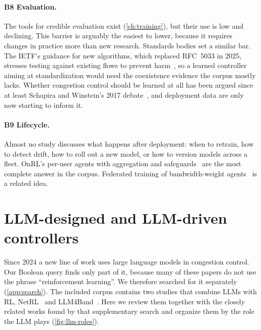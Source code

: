 \paragraph{B8 Evaluation.} The tools for credible evaluation exist (\cref{ch:training}), but their use is low and declining. This barrier is arguably the easiest to lower, because it requires changes in practice more than new research. Standards bodies set a similar bar. The IETF's guidance for new algorithms, which replaced RFC~5033 in 2025, stresses testing against existing flows to prevent harm~\cite{rfc9743}, so a learned controller aiming at standardization would need the coexistence evidence the corpus mostly lacks. Whether congestion control should be learned at all has been argued since at least Schapira and Winstein's 2017 debate~\cite{schapira2017throwdown}, and deployment data are only now starting to inform it.

\paragraph{B9 Lifecycle.} Almost no study discusses what happens after deployment: when to retrain, how to detect drift, how to roll out a new model, or how to version models across a fleet. OnRL's per-user agents with aggregation and safeguards~\cite{zhang2020onrl} are the most complete answer in the corpus. Federated training of bandwidth-weight agents~\cite{liu2022distributed} is a related idea.

\section{LLM-designed and LLM-driven controllers}
\label{sec:llm}

Since 2024 a new line of work uses large language models in congestion control. Our Boolean query finds only part of it, because many of these papers do not use the phrase ``reinforcement learning''. We therefore searched for it separately (\cref{app:search}). The included corpus contains two studies that combine LLMs with RL, NetRL~\cite{peng2026netrl} and LLM4Band~\cite{wang2025llm4band}. Here we review them together with the closely related works found by that supplementary search and organize them by the role the LLM plays (\cref{fig:llm-roles}).

